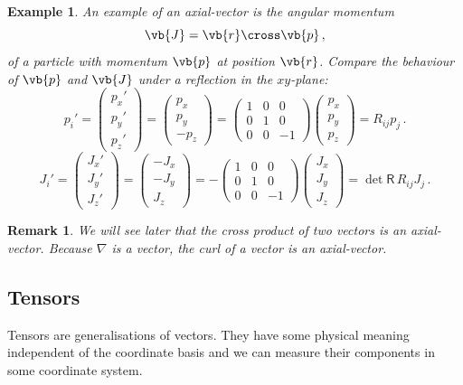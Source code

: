 \documentclass{article}
\theoremstyle{plain}\theoremheaderfont{\normalfont\itshape}\theorembodyfont{\rmfamily}\theoremseparator{.}\newtheorem*{rem}{Remark}\newtheorem*{ex}{Example}\newtheorem*{proof}{Proof}\newtheorem*{altp}{Alternative proof}
\theoremstyle{plain}\theoremheaderfont{\normalfont\bfseries}\theorembodyfont{\rmfamily}\theoremseparator{.}\newtheorem{thm}{Theorem}[section]\newtheorem{lem}[thm]{Lemma}\newtheorem{prop}[thm]{Proposition}\newtheorem*{cor}{Corollary}\newtheorem{defn}[thm]{Definition}\newtheorem{clm}[thm]{Claim}\newtheorem{clminproof}{Claim}
\theoremstyle{break}\theoremheaderfont{\normalfont\itshape}\theorembodyfont{\rmfamily}\theoremseparator{.\medskip}\newtheorem*{proofskip}{Proof}\newtheorem*{exs}{Examples}\newtheorem*{rems}{Remarks}
\theoremstyle{break}\theoremheaderfont{\normalfont\bfseries}\theorembodyfont{\rmfamily}\theoremseparator{.\medskip}\newtheorem{lemskip}[thm]{Lemma}\newtheorem{defnskip}[thm]{Definition}\newtheorem{propskip}[thm]{Proposition}\newtheorem{thmskip}[thm]{Theorem}
\numberwithin{equation}{section}
\begin{document}
	\begin{ex}
		An example of an axial-vector is the angular momentum
		\[\vb{J}=\vb{r}\cross\vb{p}\,,\]
		of a particle with momentum \(\vb{p}\) at position \(\vb{r}\). Compare the behaviour of \(\vb{p}\) and \(\vb{J}\) under a reflection in the \(xy\)-plane:
		\[p_i'=\begin{pmatrix}
				p_x' \\ p_y' \\ p_z'
			\end{pmatrix}=\begin{pmatrix}
				p_x \\ p_y \\ -p_z
			\end{pmatrix}=\begin{pmatrix}
				1 & 0 & 0\\
				0 & 1 & 0\\
				0 & 0 & -1
			\end{pmatrix}\begin{pmatrix}
				p_x \\ p_y \\ p_z
			\end{pmatrix}=R_{ij}p_j\,.\]
		\[J_i'=\begin{pmatrix}
				J_x' \\ J_y' \\ J_z'
			\end{pmatrix}=\begin{pmatrix}
				-J_x \\ -J_y \\ J_z
			\end{pmatrix}=-\begin{pmatrix}
				1 & 0 & 0\\
				0 & 1 & 0\\
				0 & 0 & -1
			\end{pmatrix}\begin{pmatrix}
				J_x \\ J_y \\ J_z
			\end{pmatrix}=\det\mathsf{R}\,R_{ij}J_j\,.\]
	\end{ex}
	\begin{rem}
		We will see later that the cross product of two vectors is an axial-vector. Because \(\nabla\) is a vector, the curl of a vector is an axial-vector.
	\end{rem}
	\subsection{Tensors}
	Tensors are generalisations of vectors. They have some physical meaning independent of the coordinate basis and we can measure their components in some coordinate system.
\end{document}
